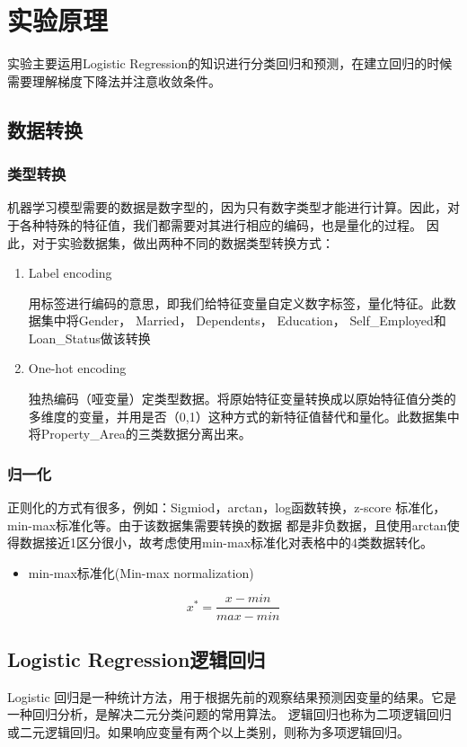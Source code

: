 \documentclass[UTF8,a4paper,AutoFakeBold,AutoFakeSlant]{article}
\begin{document}
\section{实验原理}

实验主要运用Logistic Regression的知识进行分类回归和预测，在建立回归的时候需要理解梯度下降法并注意收敛条件。


\subsection{数据转换}
\subsubsection{类型转换}
机器学习模型需要的数据是数字型的，因为只有数字类型才能进行计算。因此，对于各种特殊的特征值，我们都需要对其进行相应的编码，也是量化的过程。
因此，对于实验数据集，做出两种不同的数据类型转换方式：
\begin{enumerate}
  \item Label encoding
  
  用标签进行编码的意思，即我们给特征变量自定义数字标签，量化特征。此数据集中将Gender，	Married，	Dependents，	Education，	Self\_Employed和Loan\_Status做该转换
  \item One-hot encoding
  
  独热编码（哑变量）定类型数据。将原始特征变量转换成以原始特征值分类的多维度的变量，并用是否（0,1）这种方式的新特征值替代和量化。此数据集中将Property\_Area的三类数据分离出来。
\end{enumerate}

\subsubsection{归一化}
正则化的方式有很多，例如：Sigmiod，arctan，log函数转换，z-score 标准化，min-max标准化等。由于该数据集需要转换的数据
都是非负数据，且使用arctan使得数据接近1区分很小，故考虑使用min-max标准化对表格中的4类数据转化。
\begin{itemize}
  \item min-max标准化(Min-max normalization)
\end{itemize}
\begin{equation*}
  x^* = \frac{x-min}{max-min}
\end{equation*}


\subsection{Logistic Regression逻辑回归}
Logistic 回归是一种统计方法，用于根据先前的观察结果预测因变量的结果。它是一种回归分析，是解决二元分类问题的常用算法。
逻辑回归也称为二项逻辑回归或二元逻辑回归。如果响应变量有两个以上类别，则称为多项逻辑回归。
\end{document}
